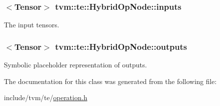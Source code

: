 \subsubsection[{\texorpdfstring{inputs}{inputs}}]{$<${\bf Tensor}$>$ tvm\+::te\+::\+Hybrid\+Op\+Node\+::inputs}\hypertarget{classtvm_1_1te_1_1HybridOpNode_a45104e4a1d31714b9eac76510d33fda5}{}\label{classtvm_1_1te_1_1HybridOpNode_a45104e4a1d31714b9eac76510d33fda5}


The input tensors. 

\subsubsection[{\texorpdfstring{outputs}{outputs}}]{$<${\bf Tensor}$>$ tvm\+::te\+::\+Hybrid\+Op\+Node\+::outputs}\hypertarget{classtvm_1_1te_1_1HybridOpNode_a6ff8e6faa8d01063e32a2c124721df29}{}\label{classtvm_1_1te_1_1HybridOpNode_a6ff8e6faa8d01063e32a2c124721df29}


Symbolic placeholder representation of outputs. 



The documentation for this class was generated from the following file\+:\begin{DoxyCompactItemize}
\item 
include/tvm/te/\hyperlink{operation_8h}{operation.\+h}\end{DoxyCompactItemize}
